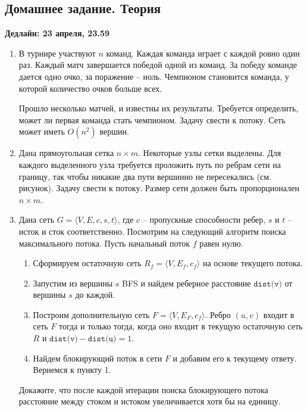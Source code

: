 \subsection{Домашнее задание. Теория}
\textbf{Дедлайн: 23 апреля, 23.59}
\begin{enumerate}

  \item В турнире участвуют $n$ команд. Каждая команда играет с каждой ровно
один раз. Каждый матч завершается победой одной из команд. За победу команде
дается одно очко, за поражение -- ноль. Чемпионом становится команда, у которой
количество очков больше всех.

  Прошло несколько матчей, и известны их результаты. Требуется определить, может
ли первая команда стать чемпионом. Задачу свести к потоку. Сеть может иметь
$O(n^2)$ вершин.

  \item Дана прямоугольная сетка $n \times m$. Некоторые узлы сетки выделены. 
Для каждого выделенного узла требуется проложить путь по ребрам сети на границу, 
так чтобы никакие два пути вершинно не пересекались (см. рисунок). 
Задачу свести к потоку. Размер сети должен быть пропорционален $n \times m$.

      

  \item Дана сеть $G = \langle V, E, c, s, t \rangle$, где $c$ -- пропускные 
способности ребер, $s$ и $t$ -- исток и сток соответственно. Посмотрим на 
следующий алгоритм поиска максимального потока. Пусть начальный поток $f$ равен 
нулю.
\begin{enumerate}
  \item Сформируем остаточную сеть $R_f = \langle V, E_f, c_f \rangle$ на основе 
    текущего потока.
  \item Запустим из вершины $s$ BFS и найдем реберное расстояние 
$\texttt{dist(v)}$ от вершины $s$ до каждой.
  \item Построим дополнительную сеть $F = \langle V, E_F, c_f \rangle$.
  Ребро $(u, v)$ входит в сеть $F$ тогда и только тогда, когда оно входит в текущую
  остаточную сеть $R$ и $\texttt{dist(v)} - \texttt{dist(u)} = 1$.
  \item Найдем блокирующий поток в сети $F$ и добавим его к текущему ответу. 
    Вернемся к пункту 1.
\end{enumerate}
  Докажите, что после каждой итерации поиска блокирующего потока расстояние между
  стоком и истоком увеличивается хотя бы на единицу.


\end{enumerate}



\clearpage
